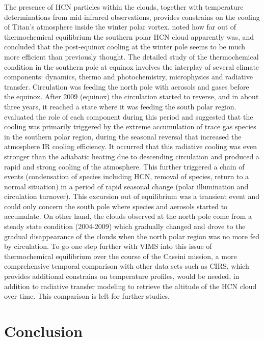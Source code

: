 \documentclass[preprint,twocolumn,5p,authoryear,compress,colorlinks=true]{elsarticle}
\begin{document}
The presence of HCN particles within the clouds, together with temperature determinations from mid-infrared observations, provides constrains on the cooling of Titan's atmosphere inside the winter polar vortex. \cite{deKok2014} noted how far out of thermochemical equilibrium the southern polar HCN cloud apparently was, and concluded that the post-equinox cooling at the winter pole seems to be much more efficient than previously thought. The detailed study of the thermochemical condition in the southern pole at equinox involves the interplay of several climate components: dynamics, thermo and photochemistry, microphysics and radiative transfer. Circulation was feeding the north pole with aerosols and gases before the equinox. After 2009 (equinox) the circulation started to reverse, and in about three years, it reached a state where it was feeding the south polar region. \cite{Teanby2017} evaluated the role of each component during this period and suggested that the cooling was primarily triggered by the extreme accumulation of trace gas species in the southern polar region, during the seasonal reversal that increased the atmosphere IR cooling efficiency. It occurred that this radiative cooling was even stronger than the adiabatic heating due to descending circulation and produced a rapid and strong cooling of the atmosphere. This further triggered a chain of events (condensation of species including HCN, removal of species, return to a normal situation) in a period of rapid seasonal change (polar illumination and circulation turnover). This excursion out of equilibrium was a transient event and could only concern the south pole where species and aerosols started to accumulate. On other hand, the clouds observed at the north pole come from a steady state condition (2004-2009) which gradually changed and drove to the gradual disappearance of the clouds when the north polar region was no more fed by circulation. To go one step further with VIMS into this issue of thermochemical equilibrium over the course of the Cassini mission, a more comprehensive temporal comparison with other data sets such as CIRS, which provides additional constrains on temperature profiles, would be needed, in addition to radiative transfer modeling to retrieve the altitude of the HCN cloud over time. This comparison is left for further studies.

\section{Conclusion}
\end{document}
